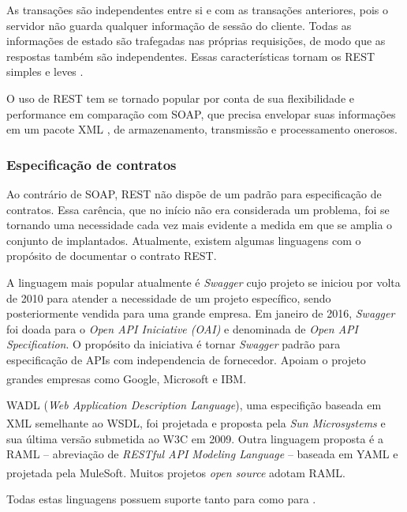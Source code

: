 As transações são independentes entre si e com as transações anteriores, pois o
servidor não guarda qualquer informação de sessão do cliente. Todas as
informações de estado são trafegadas nas próprias requisições, de modo que as
respostas também são independentes. Essas características tornam os \wss{} REST
simples e leves \cite{mumbaikar2013web}.

O uso de REST tem se tornado popular por conta de sua flexibilidade e
performance em comparação com SOAP, que precisa envelopar suas informações em
um pacote XML \cite{mumbaikar2013web}, de armazenamento, transmissão e
processamento onerosos.

\subsubsection{Especificação de contratos}
\vspace{-6mm}

Ao contrário de SOAP, REST não dispõe de um padrão para especificação de
contratos. Essa carência, que no início não era considerada um problema, foi se
tornando uma necessidade cada vez mais evidente a medida em que se amplia o
conjunto de \wss{} implantados. Atualmente, existem algumas linguagens com o
propósito de documentar o contrato REST.

A linguagem mais popular atualmente é \textit{Swagger} cujo projeto se iniciou
por volta de 2010 para atender a necessidade de um projeto específico, sendo posteriormente
vendida para uma grande empresa. Em janeiro de 2016, \textit{Swagger} foi doada
para o \textit{Open API Iniciative (OAI)} e denominada de \textit{Open API
Specification}. O propósito da iniciativa é tornar \textit{Swagger} padrão para
especificação de APIs com independencia de fornecedor. Apoiam o projeto grandes
empresas como Google\textsuperscript{\textregistered},
Microsoft\textsuperscript{\textregistered} e
IBM\textsuperscript{\textregistered}.

WADL (\textit{Web Application Description Language}), uma especifição baseada em
XML semelhante ao WSDL, foi projetada e proposta pela \textit{Sun
Microsystems}\textsuperscript{\textregistered} e sua última versão submetida
ao W3C em 2009. Outra linguagem proposta é a RAML\cite{RAML} -- abreviação de
\textit{RESTful API Modeling Language} -- baseada em YAML e projetada pela
MuleSoft\textsuperscript{\textregistered}. Muitos projetos \textit{open source} adotam RAML.

Todas estas linguagens possuem suporte tanto para \CdFirst{} como para
\CtFirst{} \cite{wideberg2015restful}.



